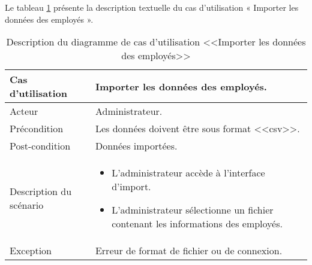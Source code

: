 Le tableau \ref{tab:importData} présente la description textuelle du cas d’utilisation « Importer les données des employés ».
\begin{longtable}[c]{
    |p{}
    |p{}|
}
    \caption{Description du diagramme de cas d’utilisation <<Importer les données des employés>>}
    \label{tab:importData}\\
    \hline
    
    Cas d’utilisation
    & Importer les données des employés. \\
    \hline 
    
    Acteur
    & Administrateur. \\
    \hline 
    
    Précondition
    & Les données doivent être sous format <<csv>>. \\
    \hline
    
    Post-condition
    & Données importées. \\
    \hline
    
    Description du
scénario

    &     \begin{itemize}
    \item L’administrateur accède à l'interface d'import.
    \item L’administrateur sélectionne  un fichier contenant les informations des employés.
    \end{itemize} \\
    \hline
    
   Exception
    & Erreur de format de fichier ou de connexion.
 \\ \hline
   
\end{longtable}




